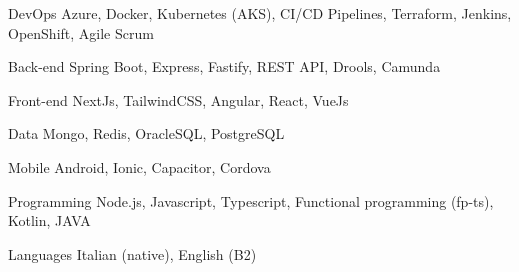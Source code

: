 

\begin{cvskills}

  \cvskill
    {DevOps} %
    {Azure, Docker, Kubernetes (AKS), CI/CD Pipelines, Terraform, Jenkins, OpenShift, Agile Scrum} %

  \cvskill
    {Back-end} %
    {Spring Boot, Express, Fastify, REST API, Drools, Camunda} %

  \cvskill
    {Front-end} %
    {NextJs, TailwindCSS, Angular, React, VueJs } %

  \cvskill
    {Data} %
    {Mongo, Redis, OracleSQL, PostgreSQL} %

  \cvskill
    {Mobile} %
    {Android, Ionic, Capacitor, Cordova} %

  \cvskill
    {Programming} %
    {Node.js, Javascript, Typescript, Functional programming (fp-ts), Kotlin, JAVA} %

  \cvskill
    {Languages} %
    {Italian (native), English (B2)} %

\end{cvskills}

